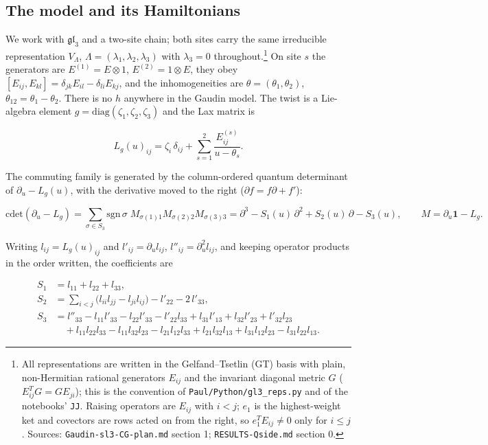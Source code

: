 \documentclass[11pt]{article}
\begin{document}
\subsection{The model and its Hamiltonians}\label{sec:model}

We work with $\mathfrak{gl}_3$ and a two-site chain; both sites carry the same irreducible representation $V_\Lambda$, $\Lambda=(\lambda_1,\lambda_2,\lambda_3)$ with $\lambda_3=0$ throughout.\footnote{All representations are written in the Gelfand--Tsetlin (GT) basis with plain, non-Hermitian rational generators $E_{ij}$ and the invariant diagonal metric $G$ ($E_{ij}^TG=GE_{ji}$); this is the convention of \texttt{Paul/\allowbreak{}Python/\allowbreak{}gl3\_\allowbreak{}reps.\allowbreak{}py} and of the notebooks' \texttt{JJ}. Raising operators are $E_{ij}$ with $i<j$; $e_1$ is the highest-weight ket and covectors are rows acted on from the right, so $e_1^TE_{ij}\neq0$ only for $i\le j$. Sources: \texttt{Gaudin-\allowbreak{}sl3-\allowbreak{}CG-\allowbreak{}plan.\allowbreak{}md} section 1; \texttt{RESULTS-\allowbreak{}Qside.\allowbreak{}md} section 0.} On site $s$ the generators are $E^{(1)}=E\otimes1$, $E^{(2)}=1\otimes E$, they obey $[E_{ij},E_{kl}]=\delta_{jk}E_{il}-\delta_{li}E_{kj}$, and the inhomogeneities are $\theta=(\theta_1,\theta_2)$, $\theta_{12}=\theta_1-\theta_2$. There is no $h$ anywhere in the Gaudin model.
The twist is a Lie-algebra element $g=\mathrm{diag}(\zeta_1,\zeta_2,\zeta_3)$ and the Lax matrix is

\begin{equation}
L_g(u)_{ij}=\zeta_i\,\delta_{ij}+\sum_{s=1}^2\frac{E^{(s)}_{ij}}{u-\theta_s}.\label{eq:Lax}
\end{equation}

The commuting family is generated by the column-ordered quantum determinant of $\partial_u-L_g(u)$, with the derivative moved to the right ($\partial f=f\partial+f'$):

\begin{equation}
\mathrm{cdet}(\partial_u-L_g)=\sum_{\sigma\in S_3}\mathrm{sgn}\,\sigma\; M_{\sigma(1)1}M_{\sigma(2)2}M_{\sigma(3)3}=\partial^3-S_1(u)\,\partial^2+S_2(u)\,\partial-S_3(u),\qquad M=\partial_u\mathbf 1-L_g.\label{eq:cdet}
\end{equation}

Writing $l_{ij}=L_g(u)_{ij}$ and $l'_{ij}=\partial_ul_{ij}$, $l''_{ij}=\partial_u^2l_{ij}$, and keeping operator products in the order written, the coefficients are

\begin{equation}
\begin{aligned}
S_1&=l_{11}+l_{22}+l_{33},\\
S_2&=\sum_{i<j}\bigl(l_{ii}l_{jj}-l_{ji}l_{ij}\bigr)-l'_{22}-2\,l'_{33},\\
S_3&=l''_{33}-l_{11}l'_{33}-l_{22}l'_{33}-l'_{22}l_{33}+l_{31}l'_{13}+l_{32}l'_{23}+l'_{32}l_{23}\\
&\quad+l_{11}l_{22}l_{33}-l_{11}l_{32}l_{23}-l_{21}l_{12}l_{33}+l_{21}l_{32}l_{13}+l_{31}l_{12}l_{23}-l_{31}l_{22}l_{13}.
\end{aligned}\label{eq:S123}
\end{equation}
\end{document}
